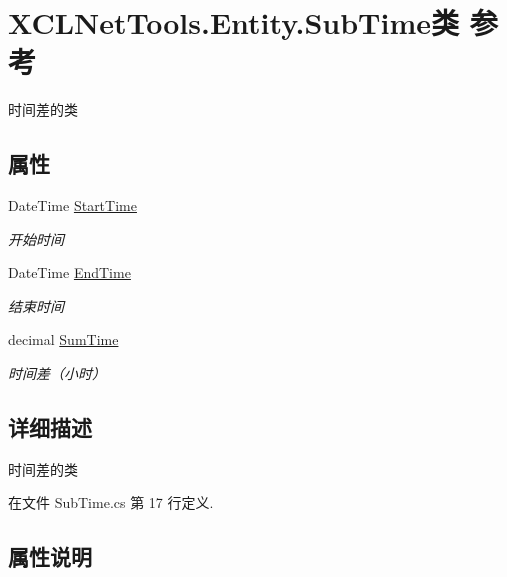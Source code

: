 \hypertarget{class_x_c_l_net_tools_1_1_entity_1_1_sub_time}{}\section{X\+C\+L\+Net\+Tools.\+Entity.\+Sub\+Time类 参考}
\label{class_x_c_l_net_tools_1_1_entity_1_1_sub_time}


时间差的类  


\subsection*{属性}
\begin{DoxyCompactItemize}
\item 
Date\+Time \hyperlink{class_x_c_l_net_tools_1_1_entity_1_1_sub_time_a7813c7a0874535abbe0b5307d7310c27}{Start\+Time}
\begin{DoxyCompactList}\small\item\em 开始时间 \end{DoxyCompactList}\item 
Date\+Time \hyperlink{class_x_c_l_net_tools_1_1_entity_1_1_sub_time_a286d907d4beb9e6153f1abdb6f2c95fd}{End\+Time}
\begin{DoxyCompactList}\small\item\em 结束时间 \end{DoxyCompactList}\item 
decimal \hyperlink{class_x_c_l_net_tools_1_1_entity_1_1_sub_time_afe5aa74e0038c4b4342be84211c3f607}{Sum\+Time}
\begin{DoxyCompactList}\small\item\em 时间差（小时） \end{DoxyCompactList}\end{DoxyCompactItemize}


\subsection{详细描述}
时间差的类 



在文件 Sub\+Time.\+cs 第 17 行定义.



\subsection{属性说明}
